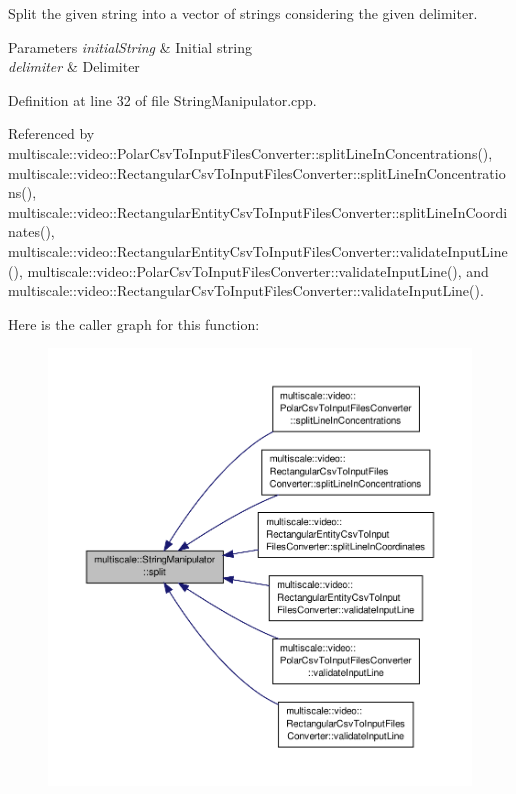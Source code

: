 Split the given string into a vector of strings considering the given delimiter. 


\begin{DoxyParams}{Parameters}
{\em initial\-String} & Initial string \\
\hline
{\em delimiter} & Delimiter \\
\hline
\end{DoxyParams}


Definition at line 32 of file String\-Manipulator.\-cpp.



Referenced by multiscale\-::video\-::\-Polar\-Csv\-To\-Input\-Files\-Converter\-::split\-Line\-In\-Concentrations(), multiscale\-::video\-::\-Rectangular\-Csv\-To\-Input\-Files\-Converter\-::split\-Line\-In\-Concentrations(), multiscale\-::video\-::\-Rectangular\-Entity\-Csv\-To\-Input\-Files\-Converter\-::split\-Line\-In\-Coordinates(), multiscale\-::video\-::\-Rectangular\-Entity\-Csv\-To\-Input\-Files\-Converter\-::validate\-Input\-Line(), multiscale\-::video\-::\-Polar\-Csv\-To\-Input\-Files\-Converter\-::validate\-Input\-Line(), and multiscale\-::video\-::\-Rectangular\-Csv\-To\-Input\-Files\-Converter\-::validate\-Input\-Line().



Here is the caller graph for this function\-:\nopagebreak
\begin{figure}[H]
\begin{center}
\leavevmode
\includegraphics[width=350pt]{classmultiscale_1_1StringManipulator_a899c72a05bbd8fb525f31bca3c1ec3c4_icgraph}
\end{center}
\end{figure}


